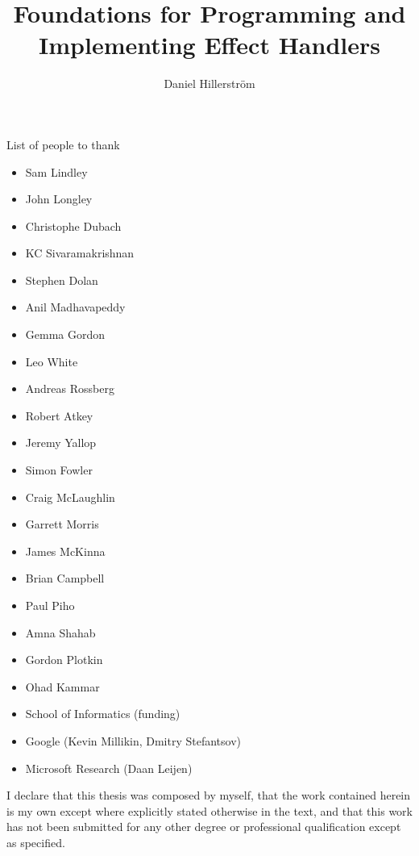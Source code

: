 \documentclass[12pt,phd,lfcs,twoside,openright,logo,leftchapter,normalheadings]{infthesis}
\title{Foundations for Programming and Implementing Effect Handlers}
\author{Daniel Hillerström}
\theoremstyle{plain}
\theoremstyle{definition}
\begin{document}
\raggedbottom
\begin{preliminary}

\maketitle

\begin{acknowledgements}
  List of people to thank
  \begin{itemize}
    \item Sam Lindley
    \item John Longley
    \item Christophe Dubach
    \item KC Sivaramakrishnan
    \item Stephen Dolan
    \item Anil Madhavapeddy
    \item Gemma Gordon
    \item Leo White
    \item Andreas Rossberg
    \item Robert Atkey
    \item Jeremy Yallop
    \item Simon Fowler
    \item Craig McLaughlin
    \item Garrett Morris
    \item James McKinna
    \item Brian Campbell
    \item Paul Piho
    \item Amna Shahab
    \item Gordon Plotkin
    \item Ohad Kammar
    \item School of Informatics (funding)
    \item Google (Kevin Millikin, Dmitry Stefantsov)
    \item Microsoft Research (Daan Leijen)
  \end{itemize}
\end{acknowledgements}

\begin{declaration}
  I declare that this thesis was composed by myself, that the work
  contained herein is my own except where explicitly stated otherwise
  in the text, and that this work has not been submitted for any other
  degree or professional qualification except as specified.
\end{declaration}


\end{preliminary}
\end{document}
